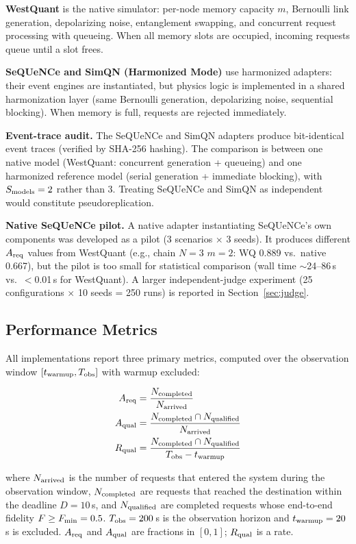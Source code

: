 \documentclass{ams-journal}
\newcommand{\Areq}{A_{\rm req}}
\newcommand{\Aqual}{A_{\rm qual}}
\begin{document}
\textbf{WestQuant} is the native simulator: per-node memory capacity $m$, Bernoulli link generation, depolarizing noise, entanglement swapping, and concurrent request processing with queueing. When all memory slots are occupied, incoming requests queue until a slot frees.

\textbf{SeQUeNCe and SimQN (Harmonized Mode)} use harmonized adapters: their event engines are instantiated, but physics logic is implemented in a shared harmonization layer (same Bernoulli generation, depolarizing noise, sequential blocking). When memory is full, requests are rejected immediately.

\textbf{Event-trace audit.} The SeQUeNCe and SimQN adapters produce bit-identical event traces (verified by SHA-256 hashing). The comparison is between one native model (WestQuant: concurrent generation + queueing) and one harmonized reference model (serial generation + immediate blocking), with $S_{\rm models} = 2$ rather than 3. Treating SeQUeNCe and SimQN as independent would constitute pseudoreplication.

\textbf{Native SeQUeNCe pilot.} A native adapter instantiating SeQUeNCe's own components was developed as a pilot (3 scenarios $\times$ 3 seeds). It produces different $\Areq$ values from WestQuant (e.g., chain $N{=}3$ $m{=}2$: WQ 0.889 vs.\ native 0.667), but the pilot is too small for statistical comparison (wall time $\sim$24--86\,s vs.\ $<$0.01\,s for WestQuant). A larger independent-judge experiment (25 configurations $\times$ 10 seeds = 250 runs) is reported in Section~\ref{sec:judge}.

\subsection{Performance Metrics}

All implementations report three primary metrics, computed over the observation window $[t_{\rm warmup}, T_{\rm obs}]$ with warmup excluded:

\begin{align}
\Areq &= \frac{N_{\rm completed}}{N_{\rm arrived}} \\
\Aqual &= \frac{N_{\rm completed} \cap N_{\rm qualified}}{N_{\rm arrived}} \\
R_{\rm qual} &= \frac{N_{\rm completed} \cap N_{\rm qualified}}{T_{\rm obs} - t_{\rm warmup}}
\end{align}

where $N_{\rm arrived}$ is the number of requests that entered the system during the observation window, $N_{\rm completed}$ are requests that reached the destination within the deadline $D = 10$\,s, and $N_{\rm qualified}$ are completed requests whose end-to-end fidelity $F \geq F_{\rm min} = 0.5$. $T_{\rm obs} = 200$\,s is the observation horizon and $t_{\rm warmup} = 20$\,s is excluded. $\Areq$ and $\Aqual$ are fractions in $[0, 1]$; $R_{\rm qual}$ is a rate.
\end{document}

